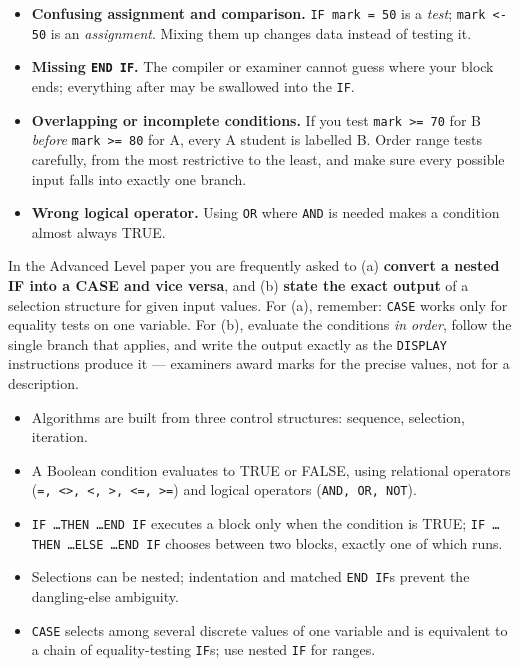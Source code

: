 \documentclass[11pt]{article}
\newcommand{\cle}[1]{{\popxbold\color{popdark}#1}}
\begin{document}
\begin{attention}
\begin{itemize}
\item \textbf{Confusing assignment and comparison.} \texttt{IF mark = 50} is a \emph{test}; \texttt{mark <- 50} is an \emph{assignment}. Mixing them up changes data instead of testing it.
\item \textbf{Missing \texttt{END IF}.} The compiler or examiner cannot guess where your block ends; everything after may be swallowed into the \texttt{IF}.
\item \textbf{Overlapping or incomplete conditions.} If you test \texttt{mark >= 70} for B \emph{before} \texttt{mark >= 80} for A, every A student is labelled B. Order range tests carefully, from the most restrictive to the least, and make sure every possible input falls into exactly one branch.
\item \textbf{Wrong logical operator.} Using \texttt{OR} where \texttt{AND} is needed makes a condition almost always TRUE.
\end{itemize}
\end{attention}

\begin{attention}
In the Advanced Level paper you are frequently asked to (a) \textbf{convert a nested IF into a CASE and vice versa}, and (b) \textbf{state the exact output} of a selection structure for given input values. For (a), remember: \texttt{CASE} works only for equality tests on one variable. For (b), evaluate the conditions \emph{in order}, follow the single branch that applies, and write the output exactly as the \texttt{DISPLAY} instructions produce it --- examiners award marks for the precise values, not for a description.
\end{attention}

\begin{aretenir}
\begin{itemize}
\item Algorithms are built from three control structures: \cle{sequence}, \cle{selection}, \cle{iteration}.
\item A \cle{Boolean condition} evaluates to TRUE or FALSE, using relational operators (\texttt{=, <>, <, >, <=, >=}) and logical operators (\texttt{AND, OR, NOT}).
\item \texttt{IF \dots THEN \dots END IF} executes a block only when the condition is TRUE; \texttt{IF \dots THEN \dots ELSE \dots END IF} chooses between two blocks, exactly one of which runs.
\item Selections can be \cle{nested}; indentation and matched \texttt{END IF}s prevent the dangling-else ambiguity.
\item \texttt{CASE} selects among several discrete values of one variable and is equivalent to a chain of equality-testing \texttt{IF}s; use nested \texttt{IF} for ranges.
\end{itemize}
\end{aretenir}
\end{document}
